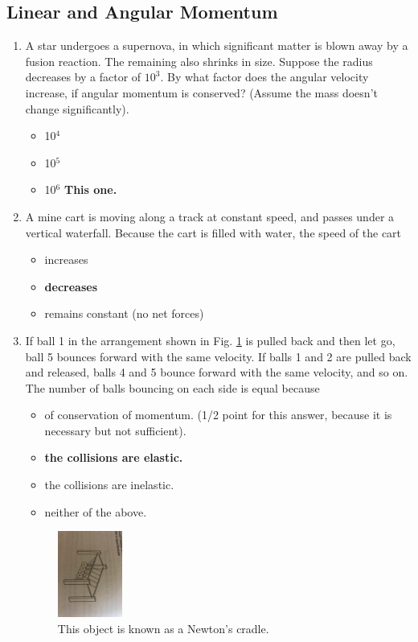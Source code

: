 \documentclass[10pt]{article}
\begin{document}
\subsection{Linear and Angular Momentum}
\begin{enumerate}
\item A star undergoes a supernova, in which significant matter is blown away by a fusion reaction.  The remaining also shrinks in size.  Suppose the radius decreases by a factor of $10^3$.  By what factor does the angular velocity increase, if angular momentum is conserved? (Assume the mass doesn't change significantly).
\begin{itemize}
\item 10$^4$
\item 10$^5$
\item 10$^6$ \textbf{This one.}
\end{itemize}
\item A mine cart is moving along a track at constant speed, and passes under a vertical waterfall.  Because the cart is filled with water, the speed of the cart
\begin{itemize}
\item increases
\item \textbf{decreases}
\item remains constant (no net forces)
\end{itemize}
\item If ball 1 in the arrangement shown in Fig. \ref{fig:newton} is pulled back and then let go, ball 5 bounces forward with the same velocity.  If balls 1 and 2 are pulled back and released, balls 4 and 5 bounce forward with the same velocity, and so on.  The number of balls bouncing on each side is equal because
\begin{itemize}
\item of conservation of momentum. (1/2 point for this answer, because it is necessary but not sufficient).
\item \textbf{the collisions are elastic.}
\item the collisions are inelastic.
\item neither of the above.
\end{itemize}
\begin{figure}
\centering
\includegraphics[width=0.2\textwidth,trim=20cm 5cm 15cm 20cm,clip=true]{newton.jpeg}
\caption{\label{fig:newton} This object is known as a Newton's cradle.}
\end{figure}
\end{enumerate}
\end{document}
